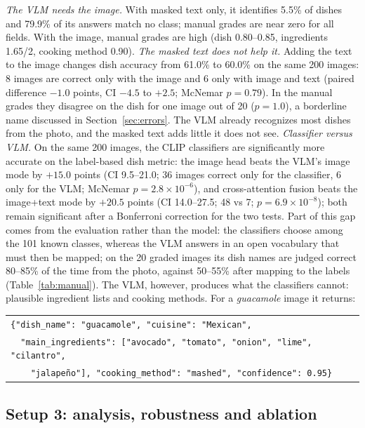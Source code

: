 \documentclass[11pt,a4paper]{article}
\begin{document}
\emph{The VLM needs the image.} With masked text only, it identifies 5.5\% of dishes and 79.9\% of its answers match
no class; manual grades are near zero for all fields. With the image, manual grades are high (dish 0.80--0.85,
ingredients 1.65/2, cooking method 0.90). \emph{The masked text does not help it.} Adding the text to the image
changes dish accuracy from 61.0\% to 60.0\% on the same 200 images: 8 images are correct only with the image and 6
only with image and text (paired difference $-1.0$ points, CI $-4.5$ to $+2.5$; McNemar $p=0.79$). In the manual grades they disagree on
the dish for one image out of 20 ($p=1.0$), a borderline name discussed in Section~\ref{sec:errors}. The VLM
already recognizes most dishes from the photo, and the masked text adds little it does not see.
\emph{Classifier versus VLM.} On the same 200 images, the CLIP classifiers are significantly more accurate on the
label-based dish metric: the image head beats the VLM's image mode by $+15.0$ points (CI 9.5--21.0; 36 images
correct only for the classifier, 6 only for the VLM; McNemar $p=2.8\times10^{-6}$), and cross-attention fusion
beats the image+text mode by $+20.5$ points (CI 14.0--27.5; 48 vs 7; $p=6.9\times10^{-8}$); both remain
significant after a Bonferroni correction for the two tests. Part of this gap comes from the evaluation rather than
the model:
the classifiers choose among the 101 known classes, whereas the VLM answers in an open vocabulary that must then be
mapped; on the 20 graded images its dish names are judged correct 80--85\% of the time from the photo, against
50--55\% after mapping to the labels (Table~\ref{tab:manual}). The VLM, however,
produces what the classifiers cannot: plausible ingredient lists and cooking methods. For a \emph{guacamole} image
it returns:
\begin{center}
\small
\begin{tabular}{@{}l@{}}
\texttt{\{"dish\_name": "guacamole", "cuisine": "Mexican",} \\
\texttt{\ \ "main\_ingredients": ["avocado", "tomato", "onion", "lime", "cilantro",} \\
\texttt{\ \ \ \ "jalape\~no"], "cooking\_method": "mashed", "confidence": 0.95\}}
\end{tabular}
\end{center}

\subsection{Setup 3: analysis, robustness and ablation}
\label{sec:res-robust}
\end{document}
